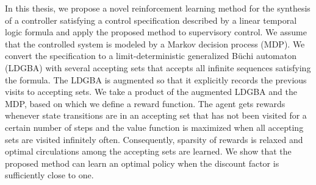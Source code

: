 In this thesis, we propose a novel reinforcement learning method for the synthesis of a controller satisfying a control specification described by a linear temporal logic formula and apply the proposed method to supervisory control. We assume that the controlled system is modeled by a Markov decision process (MDP).
We convert the specification to a limit-deterministic generalized B\"{u}chi automaton (LDGBA) with several accepting sets that accepts all infinite sequences satisfying the formula.
The LDGBA is augmented so that it explicitly records the previous visits to accepting sets.
We take a product of the augmented LDGBA and the MDP, based on which we define a reward function. The agent gets rewards whenever state transitions are in an accepting set that has not been visited for a certain number of steps and the value function is maximized when all accepting sets are visited infinitely often.
Consequently, sparsity of rewards is relaxed and optimal circulations among the accepting sets are learned. We show that the proposed method can learn an optimal policy when the discount factor is sufficiently close to one.

